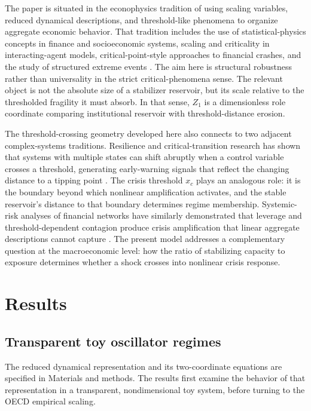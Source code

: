 \documentclass[11pt]{article}
\begin{document}
The paper is situated in the econophysics tradition of using scaling variables, reduced dynamical descriptions, and threshold-like phenomena to organize aggregate economic behavior. That tradition includes the use of statistical-physics concepts in finance and socioeconomic systems, scaling and criticality in interacting-agent models, critical-point-style approaches to financial crashes, and the study of structured extreme events \cite{MantegnaStanley1999,LuxMarchesi1999,SornetteJohansen1997,SornetteOuillon2012}. The aim here is structural robustness rather than universality in the strict critical-phenomena sense. The relevant object is not the absolute size of a stabilizer reservoir, but its scale relative to the thresholded fragility it must absorb. In that sense, $Z_1$ is a dimensionless role coordinate comparing institutional reservoir with threshold-distance erosion.

The threshold-crossing geometry developed here also connects to two adjacent complex-systems traditions. Resilience and critical-transition research has shown that systems with multiple states can shift abruptly when a control variable crosses a threshold, generating early-warning signals that reflect the changing distance to a tipping point \cite{Scheffer2009}. The crisis threshold $x_c$ plays an analogous role: it is the boundary beyond which nonlinear amplification activates, and the stable reservoir's distance to that boundary determines regime membership. Systemic-risk analyses of financial networks have similarly demonstrated that leverage and threshold-dependent contagion produce crisis amplification that linear aggregate descriptions cannot capture \cite{HaldaneMay2011,Battiston2016}. The present model addresses a complementary question at the macroeconomic level: how the ratio of stabilizing capacity to exposure determines whether a shock crosses into nonlinear crisis response.

\section{Results}
\subsection{Transparent toy oscillator regimes}
The reduced dynamical representation and its two-coordinate equations are specified in Materials and methods. The results first examine the behavior of that representation in a transparent, nondimensional toy system, before turning to the OECD empirical scaling.
\end{document}

